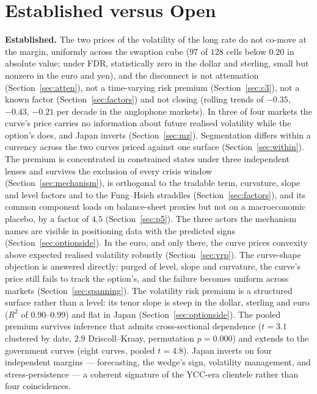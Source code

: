\documentclass[11pt]{article}
\begin{document}
\section{Established versus Open}\label{sec:open}
\textbf{Established.} The two prices of the volatility of the long rate do not co-move at the
margin, uniformly across the swaption cube ($97$ of $128$ cells below $0.20$ in absolute value; under FDR, statistically zero in the dollar and sterling, small but nonzero in the euro and yen), and the disconnect is not attenuation
(Section~\ref{sec:atten}), not a time-varying risk premium (Section~\ref{sec:c3}), not a known
factor (Section~\ref{sec:factors}) and not closing (rolling trends of $-0.35$, $-0.43$, $-0.21$ per
decade in the anglophone markets). In three of four markets the curve's price carries no information
about future realised volatility while the option's does, and Japan inverts
(Section~\ref{sec:mz}). Segmentation differs within a currency across the two curves priced against
one surface (Section~\ref{sec:within}). The premium is concentrated in constrained states under
three independent lenses and survives the exclusion of every crisis window
(Section~\ref{sec:mechanism}), is orthogonal to the tradable term, curvature, slope and level
factors and to the Fung--Hsieh straddles (Section~\ref{sec:factors}), and its common component loads
on balance-sheet proxies but not on a macroeconomic placebo, by a factor of $4.5$
(Section~\ref{sec:p5}). The three actors the mechanism names are visible in positioning data with
the predicted signs (Section~\ref{sec:optionside}). In the euro, and only there, the curve prices
convexity above expected realised volatility robustly (Section~\ref{sec:vrp}). The curve-shape objection is answered directly: purged of level, slope and curvature, the curve's price still fails to track the option's, and the failure becomes uniform across markets (Section~\ref{sec:spanning}). The volatility risk premium is a structured surface rather than a level: its tenor slope is steep in the dollar, sterling and euro ($R^2$ of $0.90$--$0.99$) and flat in Japan (Section~\ref{sec:optionside}). The pooled premium survives inference that admits cross-sectional dependence ($t=3.1$ clustered by date, $2.9$ Driscoll--Kraay, permutation $p=0.000$) and extends to the government curves (eight curves, pooled $t=4.8$). Japan inverts on four
independent margins --- forecasting, the wedge's sign, volatility management, and stress-persistence
--- a coherent signature of the YCC-era clientele rather than four coincidences.
\end{document}
